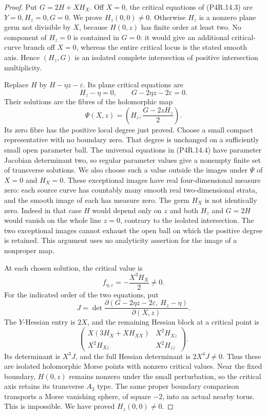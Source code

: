\begin{proof}
Put $G=2H+XH_X$. Off $X=0$, the critical equations of
(P4R.14.3) are $Y=0,H_z=0,G=0$. We prove $H_z(0,0)\ne0$.
Otherwise $H_z$ is a nonzero plane germ not divisible by
$X$, because $H(0,z)$ has finite order at least two.
No component of $H_z=0$ is contained in $G=0$: it would
give an additional critical-curve branch off $X=0$, whereas
the entire critical locus is the stated smooth axis. Hence
$(H_z,G)$ is an isolated complete intersection of positive
intersection multiplicity.

Replace $H$ by $H-\eta z-\varepsilon$. Its plane critical
equations are
\[
 H_z-\eta=0,\qquad G-2\eta z-2\varepsilon=0.              \tag{P4R.14.4}
\]
Their solutions are the fibres of the holomorphic map
\[
 \Psi(X,z)=\left(H_z,\frac{G-2zH_z}{2}\right).
\]
Its zero fibre has the positive local degree just proved.
Choose a small compact representative with no boundary zero.
That degree is unchanged on a sufficiently small open
parameter ball. The universal equations in (P4R.14.4) have
parameter Jacobian determinant two, so regular parameter
values give a nonempty finite set of transverse solutions.
We also choose such a value outside the images under $\Psi$
of $X=0$ and $H_X=0$. These exceptional images have real
four-dimensional measure zero: each source curve has
countably many smooth real two-dimensional strata, and the
smooth image of each has measure zero. The germ $H_X$ is
not identically zero. Indeed in that case $H$ would depend
only on $z$ and both $H_z$ and $G=2H$ would vanish on the
whole line $z=0$, contrary to the isolated intersection.
The two exceptional images cannot exhaust the open ball
on which the positive degree is retained. This argument
uses no analyticity assertion for the image of a nonproper
map.

At each chosen solution, the critical value is
\[
 f_{\eta,\varepsilon}=-\frac{X^3H_X}{2}\ne0.              \tag{P4R.14.5}
\]
For the indicated order of the two equations, put
\[
 J=\det\frac{\partial(G-2\eta z-2\varepsilon,\ H_z-\eta)}
                  {\partial(X,z)}.
\]
The $Y$-Hessian entry is $2X$, and the remaining Hessian
block at a critical point is
\[
 \begin{pmatrix}
 X(3H_X+XH_{XX})&X^2H_{Xz}\\
 X^2H_{Xz}&X^2H_{zz}
 \end{pmatrix}.
\]
Its determinant is $X^3J$, and the full Hessian determinant
is $2X^4J\ne0$. Thus these are isolated holomorphic Morse
points with nonzero critical values. Near the fixed boundary,
$H(0,z)$ remains nonzero under the small perturbation, so the
critical axis retains its transverse $A_3$ type. The same
proper boundary comparison transports a Morse vanishing
sphere, of square $-2$, into an actual nearby torus. This is
impossible. We have proved $H_z(0,0)\ne0$.


\end{proof}
